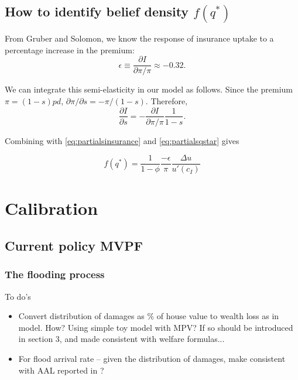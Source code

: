 \documentclass[12pt]{article}
\begin{document}
\subsection{How to identify belief density $f(q^*)$}

From Gruber and Solomon, we know the response of insurance uptake to a percentage increase in the premium: 
\begin{equation}
\epsilon\equiv\frac{\partial I}{\partial\pi/\pi}\approx-0.32.
\end{equation}

We can integrate this semi-elasticity in our model as follows. Since the premium $\pi=(1-s)pd$, $\partial \pi/\partial s=-\pi/(1-s)$. Therefore,
\begin{equation}
\frac{\partial I}{\partial s}=-\frac{\partial I}{\partial\pi/\pi}\frac{1}{1-s}.
\end{equation}

Combining with \eqref{eq:partialsinsurance} and \eqref{eq:partialsqstar} gives

\begin{equation}
f(q^*)=\frac{1}{1-\phi}\frac{-\epsilon}{\pi}\frac{\Delta u}{u'(c_I)}
\end{equation}


\section{Calibration}
\label{sec:calibration}

\subsection{Current policy MVPF}



\subsubsection{The flooding process}


To do's
\begin{itemize}
\item Convert distribution of damages as $\%$ of house value to wealth loss as in model. How? Using simple toy model with MPV? If so should be introduced in section 3, and made consistent with welfare formulas...
\item For flood arrival rate -- given the distribution of damages, make consistent with AAL reported in \cite{amornsiripanitch2025measuring}?
\end{itemize}
\end{document}

